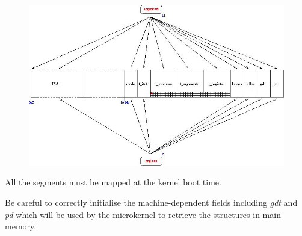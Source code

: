 \begin{figure}[h]
\centerline{\includegraphics[scale=0.5]{figures/k1-memory-layout.jpg}}
\end{figure}

All the segments must be mapped at the kernel boot time.

Be careful to correctly initialise the machine-dependent fields
including \textit{gdt} and \textit{pd} which will be used by the microkernel
to retrieve the structures in main memory.

%
%

%
%

%
%

%
%

%
%




